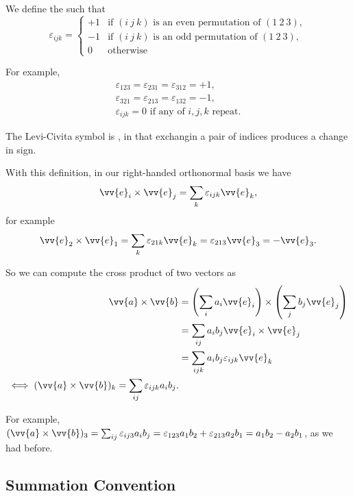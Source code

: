 \begin{definition}
    We define the  such that
    $$
    \varepsilon_{ijk} = \begin{cases}
        +1 &\mbox{if } (i\ j\ k) \text{ is an even permutation of } (1\ 2\ 3), \\
        -1 &\mbox{if } (i\ j\ k) \text{ is an odd permutation of } (1\ 2\ 3), \\ 
        0 &\mbox{otherwise}
       \end{cases}
    $$
\end{definition}

For example,
\begin{align*}
    \varepsilon_{123} =  \varepsilon_{231} =  \varepsilon_{312} = +1, \\
    \varepsilon_{321} =  \varepsilon_{213} =  \varepsilon_{132} = -1, \\
    \varepsilon_{ijk} = 0 \text{ if any of } i,j,k \text{ repeat.}
\end{align*}

The Levi-Civita symbol is , in that exchangin a pair of indices produces a change in sign.

With this definition, in our right-handed orthonormal basis we have
$$
\vv{e}_i \times \vv{e}_j = \sum_k \varepsilon_{ijk} \vv{e}_k,
$$
for example
$$
\vv{e}_2 \times \vv{e}_1 = \sum_k \varepsilon_{21k}\vv{e}_k = \varepsilon_{213} \vv{e}_3 = - \vv{e}_3.
$$

So we can compute the cross product of two vectors as
\begin{align*}
    \vv{a}\times \vv{b} &= \left(\sum_i a_i \vv{e}_i\right) \times \left(\sum_j b_j \vv{e}_j\right) \\
    &= \sum_{ij} a_i b_j \vv{e}_i \times \vv{e}_j \\
    &= \sum_{ijk} a_i b_j \varepsilon_{ijk} \vv{e}_k \\
\iff (\vv{a} \times \vv{b})_k = \sum_{ij} \varepsilon_{ijk} a_i b_j.
\end{align*}

For example, $(\vv{a} \times \vv{b})_3 = \sum_{ij} \varepsilon_{ij3} a_i b_j = \varepsilon_{123} a_1 b_2 + \varepsilon_{213} a_2 b_1 = a_1 b_2 - a_2 b_1$, as we had before.

\subsection{Summation Convention}

